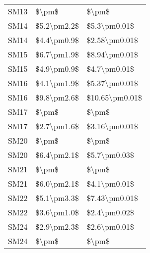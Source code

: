 \begin{longtable}{lll}
SM13        &        \$\textbackslash pm\$ &           \$\textbackslash pm\$ \\
SM14        &  \$5.2\textbackslash pm2.2\$ &    \$5.3\textbackslash pm0.01\$ \\
SM14        &  \$4.4\textbackslash pm0.9\$ &   \$2.58\textbackslash pm0.01\$ \\
SM15        &  \$6.7\textbackslash pm1.9\$ &   \$8.94\textbackslash pm0.01\$ \\
SM15        &  \$4.9\textbackslash pm0.9\$ &    \$4.7\textbackslash pm0.01\$ \\
SM16        &  \$4.1\textbackslash pm1.9\$ &   \$5.37\textbackslash pm0.01\$ \\
SM16        &  \$9.8\textbackslash pm2.6\$ &  \$10.65\textbackslash pm0.01\$ \\
SM17        &        \$\textbackslash pm\$ &           \$\textbackslash pm\$ \\
SM17        &  \$2.7\textbackslash pm1.6\$ &   \$3.16\textbackslash pm0.01\$ \\
SM20        &        \$\textbackslash pm\$ &           \$\textbackslash pm\$ \\
SM20        &  \$6.4\textbackslash pm2.1\$ &    \$5.7\textbackslash pm0.03\$ \\
SM21        &        \$\textbackslash pm\$ &           \$\textbackslash pm\$ \\
SM21        &  \$6.0\textbackslash pm2.1\$ &    \$4.1\textbackslash pm0.01\$ \\
SM22        &  \$5.1\textbackslash pm3.3\$ &   \$7.43\textbackslash pm0.01\$ \\
SM22        &  \$3.6\textbackslash pm1.0\$ &    \$2.4\textbackslash pm0.02\$ \\
SM24        &  \$2.9\textbackslash pm2.3\$ &    \$2.6\textbackslash pm0.01\$ \\
SM24        &        \$\textbackslash pm\$ &           \$\textbackslash pm\$ \\
\end{longtable}
